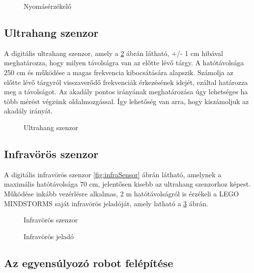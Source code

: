 \begin{figure}[!htb]
	\centering
	\caption{Nyomásérzékelő}
	\label{fig:touchSensor}
\end{figure}

\subsection{Ultrahang szenzor}
A digitális ultrahang szenzor, amely a \ref{fig:ultrasonicSensor} ábrán látható, +/- 1 cm hibával meghatározza, hogy milyen távolságra van az előtte lévő tárgy. A hatótávolsága 250 cm és működése a magas frekvencia kibocsátására  alapszik. Számolja az előtte lévő tárgyról visszaverődő frekvenciák érkezésének idejét, ezáltal határozza meg a távolságot. Az akadály pontos irányának meghatározása úgy lehetséges ha több mérést végzünk oldalmozgással. Így lehetőség van arra, hogy kiszámoljuk az akadály irányát.

\begin{figure}[!htb]
	\centering
	\caption{Ultrahang szenzor}
	\label{fig:ultrasonicSensor}
\end{figure}

\subsection{Infravörös szenzor}
A digitális infravörös szenzor \ref{fig:infraSensor} ábrán látható, amelynek a maximális hatótávolsága 70 cm, jelentősen kisebb az ultrahang szenzorhoz képest. Működése inkább vezérlésre alkalmas, 2 m hatótávolságról is érzékeli a LEGO MINDSTORMS saját infravörös jeladóját, amely latható a \ref{fig:beacon} ábrán.

\begin{figure}[!htb]
	\centering
	\caption{Infravörös szenzor}
	\label{fig:infraSensor}
	\endminipage
	\caption{Infravörös jeladó}
	\label{fig:beacon}
	\endminipage
\end{figure}

\subsection{Az egyensúlyozó robot felépítése}{\label{egyensulySubSec}}

